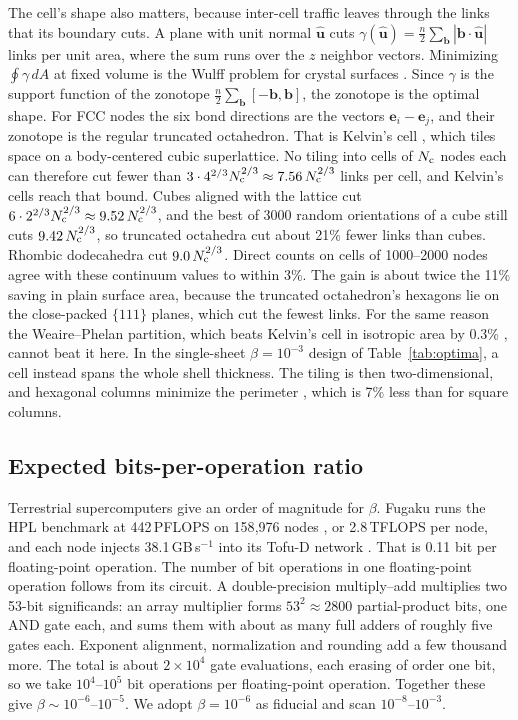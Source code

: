 \documentclass[final,5p]{elsarticle}
\begin{document}
The cell's shape also matters, because inter-cell traffic leaves through the links that its boundary cuts. A plane with unit normal $\hat{\mathbf u}$ cuts { $\gamma(\hat{\mathbf u})=\tfrac{n}{2}\sum_{\mathbf b}|\mathbf b\cdot\hat{\mathbf u}|$} links per unit area, where the sum runs over the $z$ neighbor vectors. Minimizing $\oint\gamma\,dA$ at fixed volume is the Wulff problem for crystal surfaces \citep{Herring1951,Taylor1978}. Since $\gamma$ is the support function of the zonotope $\tfrac{n}{2}\sum_{\mathbf b}[-\mathbf b,\mathbf b]$, the zonotope is the optimal shape. For FCC nodes the six bond directions are the vectors $\mathbf e_i-\mathbf e_j$, and their zonotope is the regular truncated octahedron. That is Kelvin's cell \citep{Thomson1887}, which tiles space on a body-centered cubic superlattice. No tiling into cells of $N_{\rm c}$ nodes each can therefore cut fewer than $3\cdot4^{2/3}N_{\rm c}^{2/3}\approx7.56\,N_{\rm c}^{2/3}$ links per cell, and Kelvin's cells reach that bound. Cubes aligned with the lattice cut $6\cdot2^{2/3}N_{\rm c}^{2/3}\approx9.52\,N_{\rm c}^{2/3}$, and the best of 3000 random orientations of a cube still cuts $9.42\,N_{\rm c}^{2/3}$, so truncated octahedra cut about 21\% fewer links than cubes. Rhombic dodecahedra cut $9.0\,N_{\rm c}^{2/3}$. Direct counts on cells of 1000--2000 nodes agree with these continuum values to within 3\%. The gain is about twice the 11\% saving in plain surface area, because the truncated octahedron's hexagons lie on the close-packed $\{111\}$ planes, which cut the fewest links. For the same reason the Weaire--Phelan partition, which beats Kelvin's cell in isotropic area by 0.3\% \citep{Weaire1994}, cannot beat it here. In the single-sheet $\beta=10^{-3}$ design of Table~\ref{tab:optima}, a cell instead spans the whole shell thickness. The tiling is then two-dimensional, and hexagonal columns minimize the perimeter \citep{Hales2001}, which is 7\% less than for square columns.

\subsection{Expected bits-per-operation ratio}\label{sec:beta}
Terrestrial supercomputers give an order of magnitude for $\beta$. Fugaku runs the HPL benchmark at 442\,PFLOPS on 158{,}976 nodes \citep{RIKEN2021}, or 2.8\,TFLOPS per node, and each node injects 38.1\,GB\,s$^{-1}$ into its Tofu-D network \citep{Ajima2018}. That is 0.11 bit per floating-point operation. The number of bit operations in one floating-point operation follows from its circuit. A double-precision multiply--add multiplies two 53-bit significands: an array multiplier forms $53^2\approx2800$ partial-product bits, one AND gate each, and sums them with about as many full adders of roughly five gates each. Exponent alignment, normalization and rounding add a few thousand more. The total is about $2\times10^4$ gate evaluations, each erasing of order one bit, so we take $10^4$--$10^5$ bit operations per floating-point operation. Together these give $\beta\sim10^{-6}$--$10^{-5}$. We adopt $\beta=10^{-6}$ as fiducial and scan $10^{-8}$--$10^{-3}$.
\end{document}
